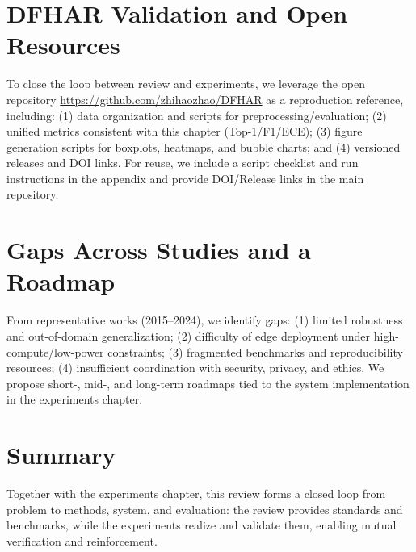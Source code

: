 \section{DFHAR Validation and Open Resources}
To close the loop between review and experiments, we leverage the open repository \url{https://github.com/zhihaozhao/DFHAR} as a reproduction reference, including: (1) data organization and scripts for preprocessing/evaluation; (2) unified metrics consistent with this chapter (Top-1/F1/ECE); (3) figure generation scripts for boxplots, heatmaps, and bubble charts; and (4) versioned releases and DOI links. For reuse, we include a script checklist and run instructions in the appendix and provide DOI/Release links in the main repository.

\section{Gaps Across Studies and a Roadmap}
From representative works (2015–2024), we identify gaps: (1) limited robustness and out-of-domain generalization; (2) difficulty of edge deployment under high-compute/low-power constraints; (3) fragmented benchmarks and reproducibility resources; (4) insufficient coordination with security, privacy, and ethics. We propose short-, mid-, and long-term roadmaps tied to the system implementation in the experiments chapter.

\section{Summary}
Together with the experiments chapter, this review forms a closed loop from problem to methods, system, and evaluation: the review provides standards and benchmarks, while the experiments realize and validate them, enabling mutual verification and reinforcement.
